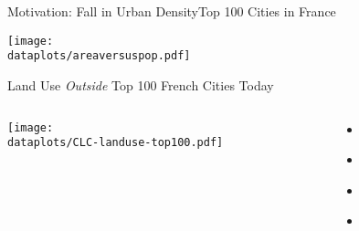 \documentclass[aspectratio=169]{beamer}
\begin{document}

\begin{frame}{Motivation: Fall in Urban Density}{Top 100 Cities in France}
\begin{adjustbox}{center}
\texttt{[image: \\dataplots/areaversuspop.pdf]}\end{adjustbox}
\end{frame}

\begin{frame}[label=CLCmeasure]{Land Use \emph{Outside} Top 100 French Cities Today}

	\begin{columns}
	\begin{column}{0.8\textwidth}
		\begin{adjustbox}{center}
			\texttt{[image: \\dataplots/CLC-landuse-top100.pdf]}
		\end{adjustbox}
	\end{column}
	\begin{column}{0.2\textwidth}
	\begin{itemize}
	\item[] \hyperlink{LandUseMeasureParis}{}
	\item[] \hyperlink{LandUseMeasureLyon}{}
	\item[] \hyperlink{LandUseMeasureMarseille}{}
	\item[] \hyperlink{LandUseMeasureBordeaux}{}
	\end{itemize}
	\end{column}
	
	\end{columns}
\end{frame}

\end{document}
